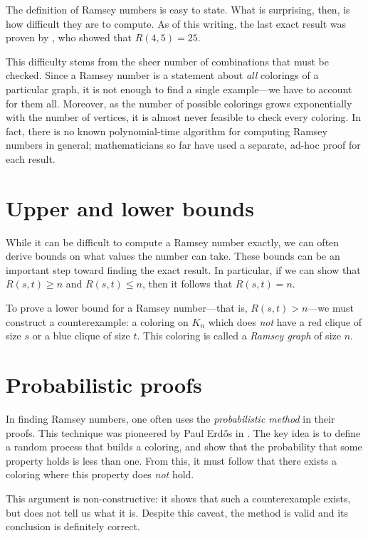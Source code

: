 \documentclass{article}
\begin{document}
The definition of Ramsey numbers is easy to state. What is surprising, then, is how difficult they are to compute. As of this writing, the last exact result was proven by \cite{JGT:JGT3190190304}, who showed that $R(4,5) = 25$.

This difficulty stems from the sheer number of combinations that must be checked. Since a Ramsey number is a statement about \emph{all} colorings of a particular graph, it is not enough to find a single example---we have to account for them all. Moreover, as the number of possible colorings grows exponentially with the number of vertices, it is almost never feasible to check every coloring. In fact, there is no known polynomial-time algorithm for computing Ramsey numbers in general; mathematicians so far have used a separate, ad-hoc proof for each result.

\section{Upper and lower bounds}

While it can be difficult to compute a Ramsey number exactly, we can often derive bounds on what values the number can take. These bounds can be an important step toward finding the exact result. In particular, if we can show that $R(s,t) \geq n$ and $R(s,t) \leq n$, then it follows that $R(s,t) = n$.

To prove a lower bound for a Ramsey number---that is, $R(s,t) > n$---we must construct a counterexample: a coloring on $K_n$ which does \emph{not} have a red clique of size $s$ or a blue clique of size $t$.  This coloring is called a \textit{Ramsey graph} of size $n$.


\section{Probabilistic proofs}

In finding Ramsey numbers, one often uses the \textit{probabilistic method} in their proofs. This technique was pioneered by Paul Erdős in . The key idea is to define a random process that builds a coloring, and show that the probability that some property holds is less than one. From this, it must follow that there exists a coloring where this property does \emph{not} hold.

This argument is non-constructive: it shows that such a counterexample exists, but does not tell us what it is. Despite this caveat, the method is valid and its conclusion is definitely correct.
\end{document}
